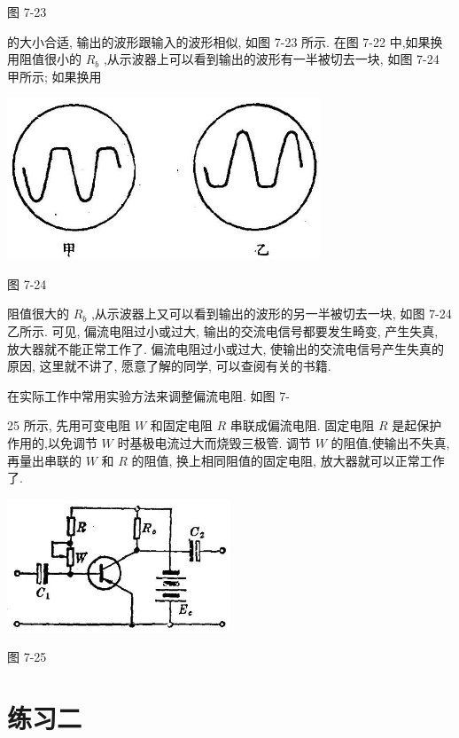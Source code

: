 \documentclass[10pt]{article}
\begin{document}
图 7-23

的大小合适, 输出的波形跟输入的波形相似, 如图 7-23 所示. 在图 7-22 中,如果换用阻值很小的 \({R}_{b}\) ,从示波器上可以看到输出的波形有一半被切去一块, 如图 7-24 甲所示; 如果换用

\begin{center}
\includegraphics[max width=0.7\textwidth]{images/01913056-1f15-74d8-9184-9aab52c9d66b_235_158695.jpg}
\end{center}

图 7-24

阻值很大的 \({R}_{b}\) ,从示波器上又可以看到输出的波形的另一半被切去一块, 如图 7-24 乙所示. 可见, 偏流电阻过小或过大, 输出的交流电信号都要发生畸变, 产生失真, 放大器就不能正常工作了. 偏流电阻过小或过大, 使输出的交流电信号产生失真的原因, 这里就不讲了, 愿意了解的同学, 可以查阅有关的书籍.

在实际工作中常用实验方法来调整偏流电阻. 如图 7-

25 所示, 先用可变电阻 \(W\) 和固定电阻 \(R\) 串联成偏流电阻. 固定电阻 \(R\) 是起保护作用的,以免调节 \(W\) 时基极电流过大而烧毁三极管. 调节 \(W\) 的阻值,使输出不失真,再量出串联的 \(W\) 和 \(R\) 的阻值, 换上相同阻值的固定电阻, 放大器就可以正常工作了.

\begin{center}
\includegraphics[max width=0.5\textwidth]{images/01913056-1f15-74d8-9184-9aab52c9d66b_236_826756.jpg}
\end{center}

图 7-25

\section*{练习二}
\end{document}
